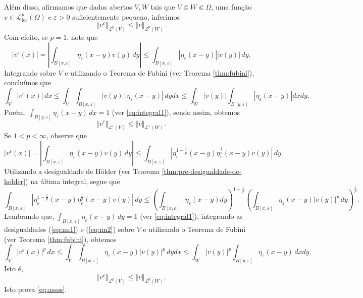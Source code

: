 \documentclass[a4paper, 11pt]{book}
\theoremstyle{definition}
\newcommand{\cL}{\mathcal{L}}
\newcommand{\loc}{\mathrm{loc}}
\begin{document}
\begin{prf}
    Além disso, afirmamos que dados abertos $V, W$ tais que $V \Subset W \Subset \Omega$, uma função $v \in \cL^p_\loc(\Omega)$ e $\varepsilon > 0$ suficientemente pequeno, inferimos
    \begin{equation} \label{eq:assss}
        \Vert v^\varepsilon \Vert_{\cL^p(V)} \leqslant \Vert v \Vert_{\cL^p(W)}.
    \end{equation}
    Com efeito, se $p = 1$, note que
    \[
        |v^\varepsilon(x)| =  \left| \int_{B[x,\varepsilon]} \eta_\varepsilon (x-y) v(y) \,dy \right| \leqslant \int_{B[x,\varepsilon]} |\eta_\varepsilon(x-y)| | v(y)| \,dy.
    \]
    Integrando sobre $V$ e utilizando o Teorema de Fubini (ver Teorema \ref{thm:fubini}), concluímos que
    \[
        \int_V |v^\varepsilon(x)| \,dx \leqslant \int_V  \int_{B[x,\varepsilon]} |v(y)||\eta_\varepsilon(x-y)| \, dydx \leqslant \int_W |v(y)| \int_{B[y,\varepsilon]} |\eta_\varepsilon (x-y)| dxdy.
    \]
    Porém, $\int_{B[y,\varepsilon]} \eta_\varepsilon(x- y) \,dx = 1$ (ver \ref{eq:integral1}), sendo assim, obtemos
    \[
        \Vert v^\varepsilon \Vert_{\cL^1(V)} \leqslant \Vert v \Vert_{\cL^1(W)}.
    \]
    Se $1 < p < \infty$, observe que
    \begin{equation} \label{eq:nn1}
        |v^\varepsilon(x)| = \left| \int_{B[x,\varepsilon]} \eta_\varepsilon(x-y) v(y) \,dy \right| \leqslant \int_{B[x,\varepsilon]} \left| \eta_\varepsilon^{1 - \frac{1}{p}} (x-y) \eta_\varepsilon^{\frac{1}{p}} (x-y) v(y) \right| \,dy.
    \end{equation}
    Utilizando a desigualdade de Hölder (ver Teorema \ref{thm:pre-desigualdade-de-holder}) na última integral, segue que
    {\small
        \begin{equation} \label{eq:nn2}
            \int_{B[x,\varepsilon]} \left| \eta_\varepsilon^{1 - \frac{1}{p}} (x-y) \eta_\varepsilon^{\frac{1}{p}} (x-y) v(y) \right| \,dy \leqslant \left( \int_{B[x,\varepsilon]} \eta_\varepsilon(x-y) dy \right)^{1 - \frac{1}{p}} \left( \int_{B[x,\varepsilon]} \eta_\varepsilon(x-y) |v(y)|^p \,dy \right)^{\frac{1}{p}}.
        \end{equation}
    }\!
    Lembrando que, $\int_{B[x,\varepsilon]} \eta_\varepsilon(x-y) \,dy = 1$ (ver \ref{eq:integral1}), integrando  as desigualdades (\ref{eq:nn1}) e (\ref{eq:nn2}) sobre $V$ e utilizando o Teorema de Fubini (ver Teorema \ref{thm:fubini}), obtemos
    \[
        \int_V |v^\varepsilon(x)|^p \,dx \leqslant \int_V \int_{B[x,\varepsilon]} \eta_\varepsilon(x-y) |v(y)|^p \,dy dx \leqslant \int_W |v(y)|^p \int_{B[y,\varepsilon]} \eta_\varepsilon(x-y) \,dxdy.
    \]
    Isto é,
    \begin{equation*}
        \Vert v^\varepsilon \Vert_{\cL^p(V)} \leqslant \Vert v \Vert_{\cL^p(W)}.
    \end{equation*}
    Isto prova \ref{eq:assss}.


\end{prf}
\end{document}
